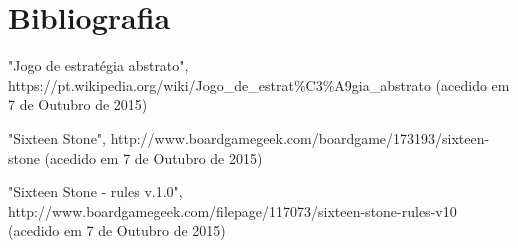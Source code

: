 \documentclass[a4paper]{article}
\begin{document}
\newpage

\section*{Bibliografia}

"Jogo de estratégia abstrato", https://pt.wikipedia.org/wiki/Jogo\_de\_estrat\%C3\%A9gia\_abstrato (acedido em 7 de Outubro de 2015) \newline

"Sixteen Stone", http://www.boardgamegeek.com/boardgame/173193/sixteen-stone (acedido em 7 de Outubro de 2015) \newline

"Sixteen Stone - rules v.1.0", http://www.boardgamegeek.com/filepage/117073/sixteen-stone-rules-v10 (acedido em 7 de Outubro de 2015) \newline
\end{document}
